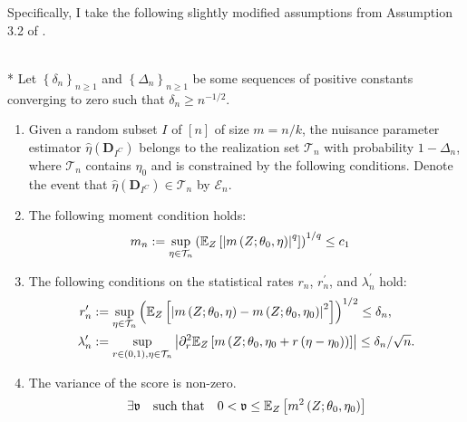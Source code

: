 Specifically, I take the following slightly modified assumptions from Assumption 3.2 of \citet{chernozhukov_doubledebiased_2018}. 
\begin{boxD}
    \begin{asm}\label{asm:DDML_Rate_Cond}\mbox{}\\*
        Let $\left\{\delta_n\right\}_{n \geq 1}$ and $\left\{\Delta_n\right\}_{n \geq 1}$ be some sequences of positive constants converging to zero such that $\delta_n \geq n^{-1 / 2}$. 
        \begin{enumerate}
            \item Given a random subset $I$ of $[n]$ of size $m = n/k$, the nuisance parameter estimator $\hat{\eta}\left(\mathbf{D}_{I^{C}}\right)$ belongs to the realization set $\mathcal{T}_{n}$ with probability $1 - \Delta_{n}$, where $\mathcal{T}_{n}$ contains $\eta_{0}$ and is constrained by the following conditions. 
            Denote the event that $\hat{\eta}\left(\mathbf{D}_{I^{C}}\right) \in \mathcal{T}_{n}$ by $\mathcal{E}_{n}$.
            \item The following moment condition holds:
            \begin{align}
                m_{n} 
                & :=\sup_{\eta \in \mathcal{T}_{n}}\left(\mathbb{E}_{Z}\left[\left|m\left(Z; \theta_0, \eta\right)\right|^q\right]\right)^{1 / q}
                \leq c_1
            \end{align}
            \item The following conditions on the statistical rates $r_{n}$, $r_{n}^{\prime}$, and $\lambda_{n}^{\prime}$ hold:
            \begin{align}
                r_{n}^{\prime}
                & :=\sup_{\eta \in \mathcal{T}_{n}}\left(\mathbb{E}_{Z}\left[\left|m\left(Z; \theta_0, \eta\right)-m\left(Z; \theta_0, \eta_0\right)\right|^2\right]\right)^{1 / 2} 
                \leq \delta_{n}, \\
                \lambda_{n}^{\prime}
                & :=\sup_{r \in(0,1), \eta \in \mathcal{T}_{n}}\left|\partial_r^2 \mathbb{E}_{Z}\left[m\left(Z; \theta_0, \eta_0+r\left(\eta-\eta_0\right)\right)\right]\right| 
                \leq \delta_{n} / \sqrt{n} .
            \end{align}
            \item The variance of the score is non-zero.
            \begin{equation}
                \exists \mathfrak{v} \quad \text{such that} \quad 
                0 < \mathfrak{v} \leq \mathbb{E}_{Z}\left[m^{2}\left(Z; \theta_0, \eta_0\right)\right]
            \end{equation}
        \end{enumerate}
    \end{asm}    
\end{boxD}
